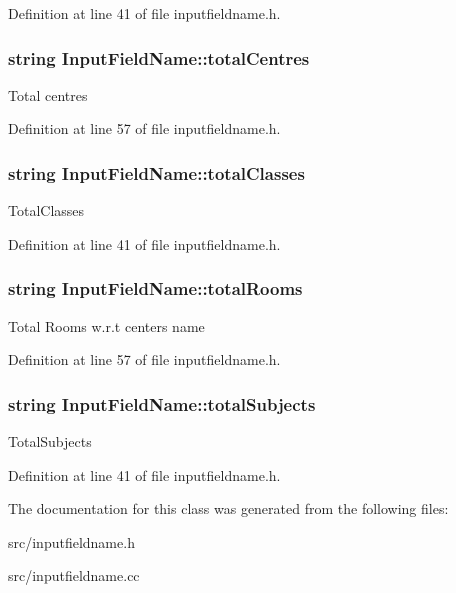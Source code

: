 Definition at line 41 of file inputfieldname.\-h.

\hypertarget{classInputFieldName_af88ac102ec3a4adbb9edc7c3d61919cb}{
\subsubsection[{total\-Centres}]{\setlength{\rightskip}{0pt plus 5cm}string Input\-Field\-Name\-::total\-Centres}}\label{classInputFieldName_af88ac102ec3a4adbb9edc7c3d61919cb}
Total centres 

Definition at line 57 of file inputfieldname.\-h.

\hypertarget{classInputFieldName_a5bf413dee6dcf29c1872e93f150d48c0}{
\subsubsection[{total\-Classes}]{\setlength{\rightskip}{0pt plus 5cm}string Input\-Field\-Name\-::total\-Classes}}\label{classInputFieldName_a5bf413dee6dcf29c1872e93f150d48c0}
Total\-Classes 

Definition at line 41 of file inputfieldname.\-h.

\hypertarget{classInputFieldName_a51fe8230341d7863ffd4672f2c986beb}{
\subsubsection[{total\-Rooms}]{\setlength{\rightskip}{0pt plus 5cm}string Input\-Field\-Name\-::total\-Rooms}}\label{classInputFieldName_a51fe8230341d7863ffd4672f2c986beb}
Total Rooms w.\-r.\-t centers name 

Definition at line 57 of file inputfieldname.\-h.

\hypertarget{classInputFieldName_ac58130077f39d82aaf447b1a67e9f70f}{
\subsubsection[{total\-Subjects}]{\setlength{\rightskip}{0pt plus 5cm}string Input\-Field\-Name\-::total\-Subjects}}\label{classInputFieldName_ac58130077f39d82aaf447b1a67e9f70f}
Total\-Subjects 

Definition at line 41 of file inputfieldname.\-h.



The documentation for this class was generated from the following files\-:\begin{DoxyCompactItemize}
\item 
src/inputfieldname.\-h\item 
src/inputfieldname.\-cc\end{DoxyCompactItemize}
